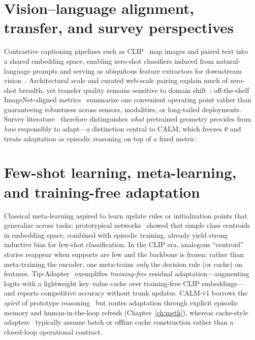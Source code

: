 \documentclass[12pt,a4paper]{report}
\begin{document}
\section{Vision--language alignment, transfer, and survey perspectives}
Contrastive captioning pipelines such as CLIP~\cite{r1} map images and paired text into a shared embedding space, enabling zero-shot classifiers induced from natural-language prompts and serving as ubiquitous feature extractors for downstream vision~\cite{r27}. Architectural scale and curated web-scale pairing explain much of zero-shot breadth, yet transfer quality remains sensitive to domain shift~\cite{r27}: off-the-shelf ImageNet-aligned metrics~\cite{r2} summarize one convenient operating point rather than guaranteeing robustness across sensors, modalities, or long-tailed deployments. Survey literature~\cite{r27} therefore distinguishes \emph{what} pretrained geometry provides from \emph{how} responsibly to adapt---a distinction central to CALM, which freezes $\theta$ and treats adaptation as episodic reasoning on top of a fixed metric.

\section{Few-shot learning, meta-learning, and training-free adaptation}
Classical meta-learning aspired to learn update rules or initialization points that generalize across tasks; prototypical networks~\cite{r3} showed that simple class centroids in embedding space, combined with episodic training, already yield strong inductive bias for few-shot classification. In the CLIP era, analogous ``centroid'' stories reappear when supports are few and the backbone is frozen: rather than meta-training the encoder, one meta-trains \emph{only} the decision rule (or cache) on features. Tip-Adapter~\cite{r4} exemplifies \emph{training-free} residual adaptation---augmenting logits with a lightweight key--value cache over training-free CLIP embeddings---and reports competitive accuracy without trunk updates. CALM-v1 borrows the \emph{spirit} of prototype reasoning~\cite{r3} but routes adaptation through explicit episodic memory and human-in-the-loop refresh (Chapter~\ref{ch:meth}), whereas cache-style adapters~\cite{r4} typically assume batch or offline cache construction rather than a closed-loop operational contract.
\end{document}
